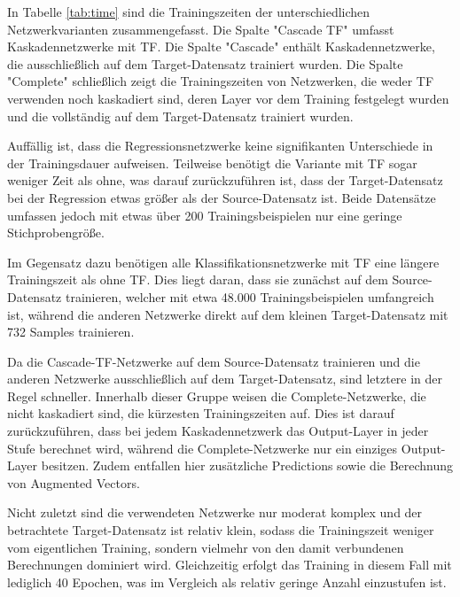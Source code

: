 In Tabelle \ref{tab:time} sind die Trainingszeiten der unterschiedlichen Netzwerkvarianten zusammengefasst. Die Spalte "Cascade TF" umfasst 
Kaskadennetzwerke mit TF. Die Spalte "Cascade" enthält Kaskadennetzwerke, die ausschließlich auf dem Target-Datensatz 
trainiert wurden. Die Spalte "Complete" schließlich zeigt die Trainingszeiten von Netzwerken, die weder TF verwenden noch kaskadiert sind, deren 
Layer vor dem Training festgelegt wurden und die vollständig auf dem Target-Datensatz trainiert wurden.

Auffällig ist, dass die Regressionsnetzwerke keine signifikanten Unterschiede in der Trainingsdauer aufweisen. Teilweise benötigt die Variante 
mit TF sogar weniger Zeit als ohne, was darauf zurückzuführen ist, dass der Target-Datensatz bei der Regression etwas größer als der 
Source-Datensatz ist. Beide Datensätze umfassen jedoch mit etwas über 200 Trainingsbeispielen nur eine geringe Stichprobengröße.

Im Gegensatz dazu benötigen alle Klassifikationsnetzwerke mit TF eine längere Trainingszeit als ohne TF. Dies liegt daran, dass sie zunächst auf 
dem Source-Datensatz trainieren, welcher mit etwa 48.000 Trainingsbeispielen umfangreich ist, während die anderen Netzwerke direkt auf dem 
kleinen Target-Datensatz mit 732 Samples trainieren.

Da die Cascade-TF-Netzwerke auf dem Source-Datensatz trainieren und die anderen Netzwerke ausschließlich auf dem Target-Datensatz, sind letztere 
in der Regel schneller. Innerhalb dieser Gruppe weisen die Complete-Netzwerke, die nicht kaskadiert sind, die kürzesten Trainingszeiten auf. Dies 
ist darauf zurückzuführen, dass bei jedem Kaskadennetzwerk das Output-Layer in jeder Stufe berechnet wird, während die Complete-Netzwerke nur ein 
einziges Output-Layer besitzen. Zudem entfallen hier zusätzliche Predictions sowie die Berechnung von Augmented Vectors.

Nicht zuletzt sind die verwendeten Netzwerke nur moderat komplex und der betrachtete Target-Datensatz ist relativ klein, sodass die Trainingszeit 
weniger vom eigentlichen Training, sondern vielmehr von den damit verbundenen Berechnungen dominiert wird. 
Gleichzeitig erfolgt das Training in diesem Fall mit lediglich 40 Epochen, was im Vergleich als relativ geringe Anzahl einzustufen ist. 

